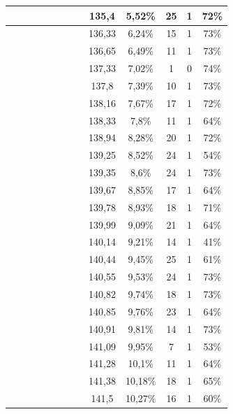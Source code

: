 \begin{center}
\begin{longtable}{|c|c|c|c|c|c|c|c|c|c|c|c|c|}
 \x &  \x &  \x &  &  \x &  \x &  &  \x & 135,4 & 5,52\% & 25 & 1 & 72\% \\ \hline
 \x &  \x &  \x &  &  &  \x &  &  & 136,33 & 6,24\% & 15 & 1 & 73\% \\ \hline
 \x &  \x &  &  &  &  \x &  \x &  \x & 136,65 & 6,49\% & 11 & 1 & 73\% \\ \hline
 \x &  &  &  &  &  \x &  &  & 137,33 & 7,02\% & 1 & 0 & 74\% \\ \hline
 \x &  &  &  \x &  \x &  \x &  &  \x & 137,8 & 7,39\% & 10 & 1 & 73\% \\ \hline
 \x &  \x &  &  &  \x &  \x &  &  & 138,16 & 7,67\% & 17 & 1 & 72\% \\ \hline
 \x &  &  \x &  &  &  &  &  & 138,33 & 7,8\% & 11 & 1 & 64\% \\ \hline
 \x &  \x &  &  \x &  &  \x &  &  & 138,94 & 8,28\% & 20 & 1 & 72\% \\ \hline
 \x &  \x &  &  &  &  &  &  \x & 139,25 & 8,52\% & 24 & 1 & 54\% \\ \hline
 \x &  \x &  &  &  &  \x &  &  & 139,35 & 8,6\% & 24 & 1 & 73\% \\ \hline
 \x &  \x &  \x &  &  &  &  &  & 139,67 & 8,85\% & 17 & 1 & 64\% \\ \hline
 \x &  &  \x &  &  \x &  \x &  &  \x & 139,78 & 8,93\% & 18 & 1 & 71\% \\ \hline
 \x &  \x &  \x &  \x &  &  &  &  & 139,99 & 9,09\% & 21 & 1 & 64\% \\ \hline
 \x &  &  &  &  &  &  &  \x & 140,14 & 9,21\% & 14 & 1 & 41\% \\ \hline
 \x &  &  &  &  \x &  &  &  \x & 140,44 & 9,45\% & 25 & 1 & 61\% \\ \hline
 \x &  &  &  \x &  &  \x &  &  & 140,55 & 9,53\% & 24 & 1 & 73\% \\ \hline
 \x &  &  \x &  &  &  \x &  &  & 140,82 & 9,74\% & 18 & 1 & 73\% \\ \hline
 \x &  \x &  \x &  &  &  &  &  \x & 140,85 & 9,76\% & 23 & 1 & 64\% \\ \hline
 \x &  \x &  \x &  \x &  &  \x &  &  \x & 140,91 & 9,81\% & 14 & 1 & 73\% \\ \hline
 \x &  \x &  &  &  &  &  &  & 141,09 & 9,95\% & 7 & 1 & 53\% \\ \hline
 \x &  &  \x &  &  &  &  &  \x & 141,28 & 10,1\% & 11 & 1 & 64\% \\ \hline
 \x &  &  \x &  &  \x &  &  &  \x & 141,38 & 10,18\% & 18 & 1 & 65\% \\ \hline
 \x &  &  &  &  \x &  &  &  & 141,5 & 10,27\% & 16 & 1 & 60\% \\ \hline

\end{longtable}
\end{center}
